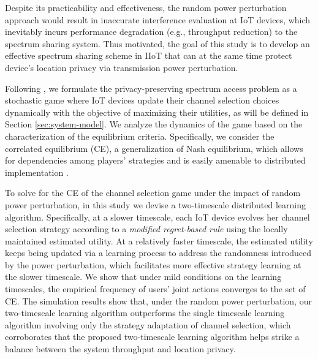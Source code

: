Despite its practicability and effectiveness, the random power perturbation approach would result in inaccurate interference evaluation at IoT devices, which inevitably incurs performance degradation (e.g., throughput reduction) to the spectrum sharing system. Thus motivated, the goal of this study is to develop an effective spectrum sharing scheme in IIoT that can at the same time protect device's location privacy via transmission power perturbation. 

Following \cite{Chenjournal}, we formulate the privacy-preserving spectrum access problem as a stochastic game where IoT devices update their channel selection choices dynamically with the objective of maximizing their utilities, as will be defined in Section \ref{sec:system-model}. 
We analyze the dynamics of the game based on the characterization of the equilibrium criteria. Specifically, we consider the correlated equilibrium (CE), a generalization of Nash equilibrium, which allows for dependencies among players' strategies and is easily amenable to distributed implementation \cite{Lasaulce2011}. 

To solve for the CE of the channel selection game under the impact of random power perturbation, in this study we devise a two-timescale distributed learning algorithm. Specifically, at a slower timescale, each IoT device evolves her channel selection strategy according to a \emph{modified regret-based rule} \cite{Hart_areinforcement} using the locally maintained estimated utility. At a relatively faster timescale, the estimated utility keeps being updated via a learning process to address the randomness introduced by the power perturbation, which facilitates more effective strategy learning at the slower timescale. We show that under mild conditions on the learning timescales, the empirical frequency of users' joint actions converges to the set of CE. The simulation results show that, under the random power perturbation, our two-timescale learning algorithm outperforms the single timescale learning algorithm involving only the strategy adaptation of channel selection, which corroborates that the proposed two-timescale learning algorithm helps strike a balance between the system throughput and location privacy.


